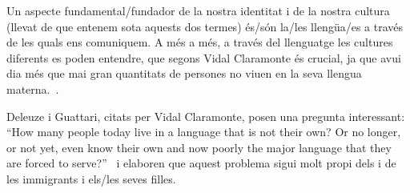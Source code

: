 Un aspecte fundamental/fundador de la nostra identitat i de la nostra cultura (llevat de que entenem sota aquests dos termes) és/són la/les llengüa/es a través de les quals ens comuniquem.
A més a més, a través del llenguatge les cultures diferents es poden entendre, que segons Vidal Claramonte és crucial, ja que avui dia més que mai gran quantitats de persones no viuen en la seva llengua materna.~\autocite{Vidal2012}.

Deleuze i Guattari, citats per Vidal Claramonte, posen una pregunta interessant:
``How many people today live in a language that is not their own? Or no longer, or not yet, even know their own and now poorly the major language that they are forced to serve?''~\autocite{Vidal2012}
i elaboren que aquest problema sigui molt propi dels i de les immigrants i els/les seves filles.

